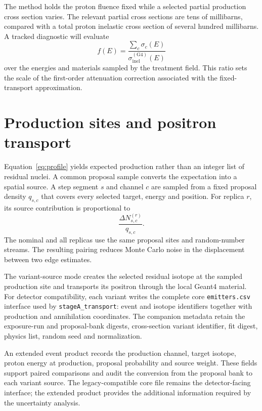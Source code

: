 \documentclass[11pt]{article}
\newcommand{\file}[1]{\texttt{#1}}
\begin{document}
The method holds the proton fluence fixed while a selected partial production
cross section varies.  The relevant partial cross sections are tens of
millibarns, compared with a total proton inelastic cross section of several
hundred millibarns.  A tracked diagnostic will evaluate
\begin{equation}
  f(E)=\frac{\sum_c\sigma_c(E)}{\sigma_{\mathrm{inel}}^{(\mathrm{G4})}(E)}
  \label{eq:fluence-check}
\end{equation}
over the energies and materials sampled by the treatment field.  This ratio
sets the scale of the first-order attenuation correction associated with the
fixed-transport approximation.

\section{Production sites and positron transport}

Equation~\eqref{eq:profile} yields expected production rather than an integer
list of residual nuclei.  A common proposal sample converts the expectation
into a spatial source.  A step segment $s$ and channel $c$ are sampled from a
fixed proposal density $q_{s,c}$ that covers every selected target, energy and
position.  For replica $r$, its source contribution is proportional to
\begin{equation}
  \frac{\Delta N_{s,c}^{(r)}}{q_{s,c}}.
  \label{eq:proposal}
\end{equation}
The nominal and all replicas use the same proposal sites and random-number
streams.  The resulting pairing reduces Monte Carlo noise in the displacement
between two edge estimates.

The variant-source mode creates the selected residual isotope at the sampled
production site and transports its positron through the local Geant4 material.
For detector compatibility, each variant writes the complete core
\file{emitters.csv} interface used by \file{stageA\_transport}: event and
isotope identifiers together with production and annihilation coordinates.
The companion metadata retain the exposure-run and proposal-bank digests,
cross-section variant identifier, fit digest, physics list, random seed and
normalization.

An extended event product records the production channel, target isotope,
proton energy at production, proposal probability and source weight.  These
fields support paired comparisons and audit the conversion from the proposal
bank to each variant source.  The legacy-compatible core file remains the
detector-facing interface; the extended product provides the additional
information required by the uncertainty analysis.
\end{document}
